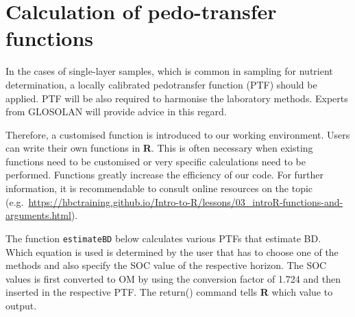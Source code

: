 \documentclass[
  10pt,
  b5paper,
  oneside]{book}
\begin{document}
\hypertarget{calculation-of-pedo-transfer-functions}{%
\section{Calculation of pedo-transfer functions}\label{calculation-of-pedo-transfer-functions}}

In the cases of single-layer samples, which is common in sampling for nutrient determination, a locally calibrated pedotransfer function (PTF) should be applied. PTF will be also required to harmonise the laboratory methods. Experts from GLOSOLAN will provide advice in this regard.

Therefore, a customised function is introduced to our working environment. Users can write their own functions in \textbf{R}. This is often necessary when existing functions need to be customised or very specific calculations need to be performed. Functions greatly increase the efficiency of our code. For further information, it is recommendable to consult online resources on the topic (e.g.~\url{https://hbctraining.github.io/Intro-to-R/lessons/03_introR-functions-and-arguments.html}).

The function \texttt{estimateBD} below calculates various PTFs that estimate BD. Which equation is used is determined by the user that has to choose one of the methods and also specify the SOC value of the respective horizon. The SOC values is first converted to OM by using the conversion factor of 1.724 and then inserted in the respective PTF. The return() command tells \textbf{R} which value to output.
\end{document}
